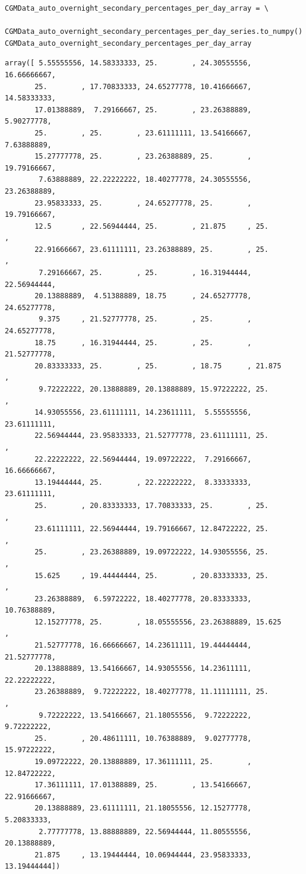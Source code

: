 \begin{verbatim}
CGMData_auto_overnight_secondary_percentages_per_day_array = \
    CGMData_auto_overnight_secondary_percentages_per_day_series.to_numpy()
CGMData_auto_overnight_secondary_percentages_per_day_array
\end{verbatim}

\begin{verbatim}
array([ 5.55555556, 14.58333333, 25.        , 24.30555556, 16.66666667,
       25.        , 17.70833333, 24.65277778, 10.41666667, 14.58333333,
       17.01388889,  7.29166667, 25.        , 23.26388889,  5.90277778,
       25.        , 25.        , 23.61111111, 13.54166667,  7.63888889,
       15.27777778, 25.        , 23.26388889, 25.        , 19.79166667,
        7.63888889, 22.22222222, 18.40277778, 24.30555556, 23.26388889,
       23.95833333, 25.        , 24.65277778, 25.        , 19.79166667,
       12.5       , 22.56944444, 25.        , 21.875     , 25.        ,
       22.91666667, 23.61111111, 23.26388889, 25.        , 25.        ,
        7.29166667, 25.        , 25.        , 16.31944444, 22.56944444,
       20.13888889,  4.51388889, 18.75      , 24.65277778, 24.65277778,
        9.375     , 21.52777778, 25.        , 25.        , 24.65277778,
       18.75      , 16.31944444, 25.        , 25.        , 21.52777778,
       20.83333333, 25.        , 25.        , 18.75      , 21.875     ,
        9.72222222, 20.13888889, 20.13888889, 15.97222222, 25.        ,
       14.93055556, 23.61111111, 14.23611111,  5.55555556, 23.61111111,
       22.56944444, 23.95833333, 21.52777778, 23.61111111, 25.        ,
       22.22222222, 22.56944444, 19.09722222,  7.29166667, 16.66666667,
       13.19444444, 25.        , 22.22222222,  8.33333333, 23.61111111,
       25.        , 20.83333333, 17.70833333, 25.        , 25.        ,
       23.61111111, 22.56944444, 19.79166667, 12.84722222, 25.        ,
       25.        , 23.26388889, 19.09722222, 14.93055556, 25.        ,
       15.625     , 19.44444444, 25.        , 20.83333333, 25.        ,
       23.26388889,  6.59722222, 18.40277778, 20.83333333, 10.76388889,
       12.15277778, 25.        , 18.05555556, 23.26388889, 15.625     ,
       21.52777778, 16.66666667, 14.23611111, 19.44444444, 21.52777778,
       20.13888889, 13.54166667, 14.93055556, 14.23611111, 22.22222222,
       23.26388889,  9.72222222, 18.40277778, 11.11111111, 25.        ,
        9.72222222, 13.54166667, 21.18055556,  9.72222222,  9.72222222,
       25.        , 20.48611111, 10.76388889,  9.02777778, 15.97222222,
       19.09722222, 20.13888889, 17.36111111, 25.        , 12.84722222,
       17.36111111, 17.01388889, 25.        , 13.54166667, 22.91666667,
       20.13888889, 23.61111111, 21.18055556, 12.15277778,  5.20833333,
        2.77777778, 13.88888889, 22.56944444, 11.80555556, 20.13888889,
       21.875     , 13.19444444, 10.06944444, 23.95833333, 13.19444444])
\end{verbatim}

